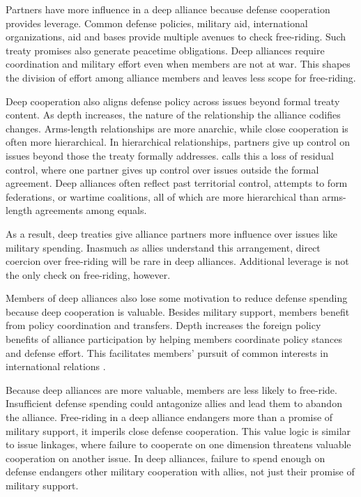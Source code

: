 \documentclass[12pt]{article}
\begin{document}
Partners have more influence in a deep alliance because defense cooperation provides leverage. 
Common defense policies, military aid, international organizations, aid and bases provide multiple avenues to check free-riding. 
Such treaty promises also generate peacetime obligations. 
Deep alliances require coordination and military effort even when members are not at war. 
This shapes the division of effort among alliance members and leaves less scope for free-riding. 


Deep cooperation also aligns defense policy across issues beyond formal treaty content. 
As depth increases, the nature of the relationship the alliance codifies changes. 
Arms-length relationships are more anarchic, while close cooperation is often more hierarchical. 
In hierarchical relationships, partners give up control on issues beyond those the treaty formally addresses. 
\citet{Lake1996} calls this a loss of residual control, where one partner gives up control over issues outside the formal agreement. 
Deep alliances often reflect past territorial control, attempts to form federations, or wartime coalitions, all of which are more hierarchical than arms-length agreements among equals. 


As a result, deep treaties give alliance partners more influence over issues like military spending.
Inasmuch as allies understand this arrangement, direct coercion over free-riding will be rare in deep alliances.  
Additional leverage is not the only check on free-riding, however. 


Members of deep alliances also lose some motivation to reduce defense spending because deep cooperation is valuable. 
Besides military support, members benefit from policy coordination and transfers. 
Depth increases the foreign policy benefits of alliance participation by helping members coordinate policy stances and defense effort.
This facilitates members' pursuit of common interests in international relations \citep{Snyder1997}. 


Because deep alliances are more valuable, members are less likely to free-ride. 
Insufficient defense spending could antagonize allies and lead them to abandon the alliance. 
Free-riding in a deep alliance endangers more than a promise of military support, it imperils close defense cooperation. 
This value logic is similar to issue linkages, where failure to cooperate on one dimension threatens valuable cooperation on another issue. 
In deep alliances, failure to spend enough on defense endangers other military cooperation with allies, not just their promise of military support. 
\end{document}
